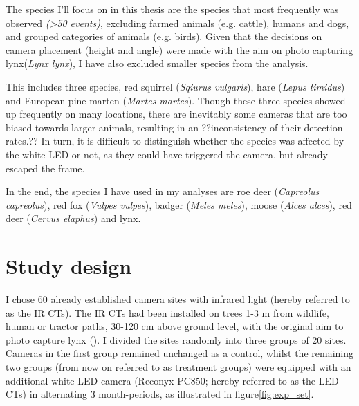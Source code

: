 
The species I'll focus on in this thesis are the species that most frequently was observed \emph{(>50 events)}, excluding farmed animals (e.g. cattle), humans and dogs, and grouped categories of animals (e.g. birds).
Given that the decisions on camera placement (height and angle) were made with the aim on photo capturing lynx(\textit{Lynx lynx}), I have also excluded smaller species from the analysis.


This includes three species, red squirrel (\textit{Sqiurus vulgaris}), hare (\textit{Lepus timidus}) and European pine marten (\textit{Martes martes}). 
Though these three species showed up frequently on many locations, there are inevitably some cameras that are too biased towards larger animals, resulting in an ??inconsistency of their detection rates.?? %
In turn, it is difficult to distinguish whether the species was affected by the white LED or not, as they could have triggered the camera, but already escaped the frame. %

In the end, the species I have used in my analyses are roe deer (\textit{Capreolus capreolus}), red fox (\textit{Vulpes vulpes}), badger (\textit{Meles meles}), moose (\textit{Alces alces}), red deer (\textit{Cervus elaphus}) and lynx. 




\section{Study design} 
I chose 60 %
already established camera sites with infrared light (hereby referred to as the IR CTs). The IR CTs had been installed on trees 1-3 m from wildlife, human or tractor paths, 30-120 cm above ground level, with the original aim to photo capture lynx (\cite{Odden2015}). 
I divided the sites randomly into three groups of 20 sites. Cameras in the first group remained unchanged as a control, whilst the remaining two groups (from now on referred to as treatment groups) were equipped with an additional white LED camera (Reconyx PC850; hereby referred to as the LED CTs) in alternating 3 month-periods, as illustrated in figure\vref{fig:exp_set}.


